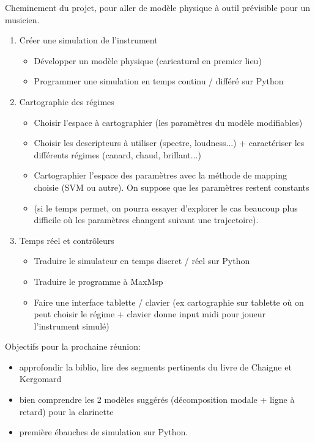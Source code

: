 \documentclass[a4paper, 11pt]{article}
\begin{document}
Cheminement du projet, pour aller de modèle physique à outil prévisible pour un musicien.
\begin{enumerate}
\item Créer une simulation de l'instrument
	\begin{itemize}
	\item Développer un modèle physique (caricatural en premier lieu)
	\item Programmer une simulation en temps continu / différé sur Python
	\end{itemize}
\item Cartographie des régimes
	\begin{itemize}
	\item Choisir l'espace à cartographier (les paramètres du modèle modifiables)
	\item Choisir les descripteurs à utiliser (spectre, loudness...) + caractériser les différents régimes (canard, chaud, brillant...)
	\item Cartographier l'espace des paramètres avec la méthode de mapping choisie (SVM ou autre). On suppose que les paramètres restent constants
	\item (si le temps permet, on pourra essayer d'explorer le cas beaucoup plus difficile où les paramètres changent suivant une trajectoire).
	\end{itemize}
\item Temps réel et contrôleurs
	\begin{itemize}
	\item Traduire le simulateur en temps discret / réel sur Python
	\item Traduire le programme à MaxMsp
	\item Faire une interface tablette / clavier (ex cartographie sur tablette où on peut choisir le régime + clavier donne input midi pour joueur l'instrument simulé)
	\end{itemize}
\end{enumerate}

\bigskip

Objectifs pour la prochaine réunion:
\begin{itemize}
\item approfondir la biblio, lire des segments pertinents du livre de Chaigne et Kergomard
\item bien comprendre les 2 modèles suggérés (décomposition modale + ligne à retard) pour la clarinette
\item première ébauches de simulation sur Python.
\end{itemize}
\end{document}
